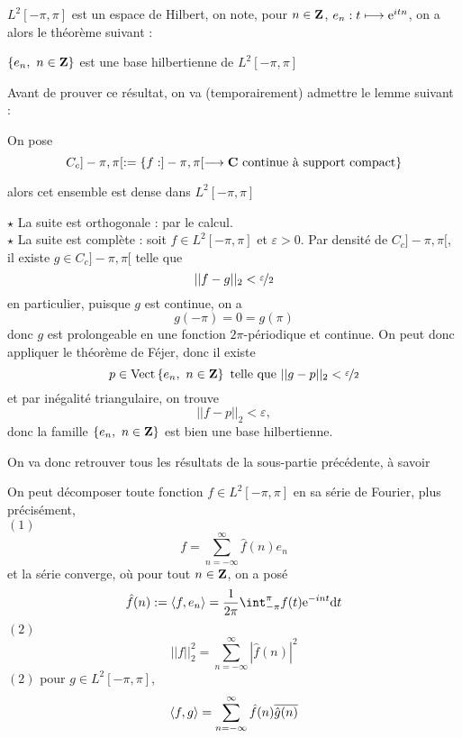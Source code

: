 \documentclass[a4paper,11pt, twoside]{article}
\begin{document}
$L^2[-\pi,\pi]$ est un espace de Hilbert, on note, pour $n\in\mathbf Z$, $e_n:t\longmapsto\mathrm{e}^{itn}$, on a alors le théorème suivant :


\begin{Th}
  $\left\{e_n,\ n\in\mathbf Z\right\}$ est une base hilbertienne de $L^2[-\pi,\pi]$
\end{Th}

Avant de prouver ce résultat, on va (temporairement) admettre le lemme suivant : 


\begin{lemme}
  On pose 
  $$C_c]-\pi,\pi[:=\left\{f:]-\pi,\pi[\longrightarrow\mathbf C\text{ continue à support compact}\right\}$$

  alors cet ensemble est dense dans $L^2[-\pi,\pi]$
\end{lemme}



\begin{Proof}
  $\star$ La suite est orthogonale : par le calcul.\\

  $\star$ La suite est complète : soit $f\in L^2[-\pi,\pi]$ et $\varepsilon>0$. Par densité de $C_c]-\pi,\pi[$, il existe $g\in C_c]-\pi,\pi[$ telle que 
  $$||f-g||_2<\displaystyle\nicefrac{\varepsilon}{2}$$
  en particulier, puisque $g$ est continue, on a 
  $$g(-\pi)=0=g(\pi)$$
  donc $g$ est prolongeable en une fonction $2\pi$-périodique et continue. On peut donc appliquer le théorème de Féjer, donc il existe 
  $$p\in\mathrm{Vect}\left\{e_n,\ n\in\mathbf Z\right\}\text{ telle que }||g-p||_2<\displaystyle\nicefrac{\varepsilon}{2}$$
  et par inégalité triangulaire, on trouve 
  $$||f-p||_2<\varepsilon,$$
  donc la famille $\left\{e_n,\ n\in\mathbf Z\right\}$ est bien une base hilbertienne.
\end{Proof}


On va donc retrouver tous les résultats de la sous-partie précédente, à savoir 


\begin{Th}
  On peut décomposer toute fonction $f\in L^2[-\pi,\pi]$ en sa série de Fourier, plus précisément,\\

  $(\mathit 1)$ 
  $$f=\sum_{n=-\infty}^{\infty}\hat f(n)e_n$$
  et la série converge, où pour tout $n\in\mathbf Z$, on a posé 
  $$\hat f(n):=\ps{f,e_n}=\frac{1}{2\pi}\int_{-\pi}^{\pi}f(t)\ex{-int}\dt$$
  $(\mathit 2)$  
  $$||f||_2^2=\sum_{n=-\infty}^{\infty}|\hat f(n)|^2$$
  $(\mathit 2)$ pour $g\in L^2[-\pi,\pi]$,
  $$\left\langle f,g \right\rangle=\sum_{n=-\infty}^{\infty}\hat f(n)\overline{\hat g(n)}$$
\end{Th}
\end{document}
